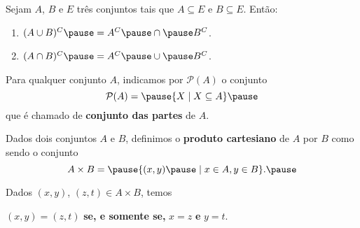 \documentclass{beamer}
\begin{document}
    \begin{frame}
        \begin{proposicao}
            Sejam $A$, $B$ e $E$ tr{\^e}s conjuntos \pause tais que $A\subseteq E$ \pause e $B\subseteq E$. \pause Ent{\~a}o:\pause
            \begin{enumerate}[label={\roman*})]
                \item $(A\cup B)^C \pause = A^C \pause \cap \pause B^C$.\pause
                \item $(A\cap B)^C \pause = A^C \pause \cup \pause B^C$.
            \end{enumerate}
        \end{proposicao}
    \end{frame}

    \begin{frame}
        \begin{definicao}
            Para qualquer conjunto $A$, \pause indicamos por $\mathcal{P}(A)$ \pause o conjunto\pause
            \[
                \mathcal{P}(A) = \pause \{ X \mid X\subseteq A\}\pause
            \]
            que \'e chamado de \textbf{conjunto das partes} de $A$.
        \end{definicao}
    \end{frame}

    \begin{frame}
        \begin{definicao}
        Dados dois conjuntos $A$ e $B$, \pause definimos o \textbf{produto cartesiano} \pause de $A$ por $B$ como sendo o conjunto\pause
        \[
            A \times B = \pause \{(x,y) \pause \mid x\in A, y\in B\}.\pause
        \]
        \end{definicao}

        Dados $(x,y)$, \pause $(z,t) \in A\times B$, \pause temos
        \begin{center}
            $(x,y) = (z,t)$ \pause \textbf{se, e somente se,} $x = z$ \pause \textbf{e} $y = t$.
        \end{center}

    \end{frame}
\end{document}
